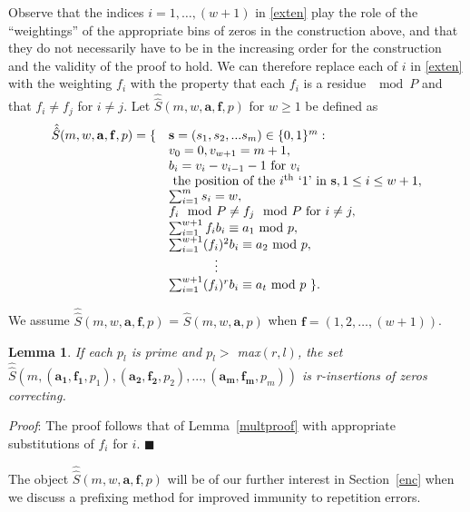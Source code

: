 \documentclass[12pt]{article} \pagestyle{plain} \topmargin
\newtheorem{lemma}{Lemma}
\begin{document}
Observe that the indices $i=1,\dots,(w+1)$ in \eqref{exten} play the
role of the ``weightings'' of the appropriate bins of zeros in the
construction above, and that they do not necessarily have to be in
the increasing order for the construction and the validity of the
proof to hold. We can therefore replace each of $i$ in \eqref{exten}
with the weighting $f_i$ with the property that each $f_i$ is a
residue $\mod P$ and that $f_i \neq f_j$ for $i\neq j$. Let
$\hat{\hat{S}}(m,w,\mathbf{a},\mathbf{f}, p)$  for $w \geq 1$ be
defined as
\begin{equation}\label{exten2}\begin{array}{lll}\hat{\hat{S}}(m,w,\mathbf{a},\mathbf{f},p) = \{ & \mathbf{s}=(s_1, s_2, ... s_m) \in \{0,1\}^m
:\\{} & v_0=0, v_{w+1}=m+1,\\{} & b_i=v_i-v_{i-1}-1 \text{ for } v_i \\ {} &  \text{ the position of the } i^{\text{th} }\text{ `1' in } \mathbf{s},1 \leq i \leq w+1,\\
{} & \sum_{i=1}^m s_i = w,\\
{} & f_i \mod P \neq f_j \mod P \text{ for } i \neq j,\\
 {} & \sum_{i=1}^{w+1} f_ib_i \equiv a_1 \text{ mod } p,\\ {} &
\sum_{i=1}^{w+1} (f_i)^2b_i
\equiv a_2 \text{ mod } p,\\
{} & \hspace{0.5in}\vdots\\ {} & \sum_{i=1}^{w+1} (f_i)^rb_i \equiv
a_t \text{ mod } p~\}.\end{array}\end{equation}

We assume $\hat{\hat{S}}(m,w,\mathbf{a},\mathbf{f}, p)$ =
$\hat{S}(m,w,\mathbf{a},p)$ when $\mathbf{f}=(1,2,\dots,(w+1))$.

\begin{lemma}\label{multproof2}\textit{If each $p_l$ is prime and $p_l >$
max$(r,l)$, the set
$\hat{\hat{S}}\left(m,(\mathbf{a_1},\mathbf{f_1},
p_1),(\mathbf{a_2},\mathbf{f_2},
p_2),...,(\mathbf{a_m},\mathbf{f_m}, p_m)\right)$ is r-insertions of
zeros correcting.}\end{lemma}

\textit{Proof}: The proof follows that of Lemma~\ref{multproof}
with appropriate substitutions of $f_i$ for $i$.
\hfill$\blacksquare$

The object $\hat{\hat{S}}(m,w,\mathbf{a},\mathbf{f}, p)$ will be of
our further interest in Section~\ref{enc}  when we discuss a
prefixing method for improved immunity to repetition errors.
\end{document}
